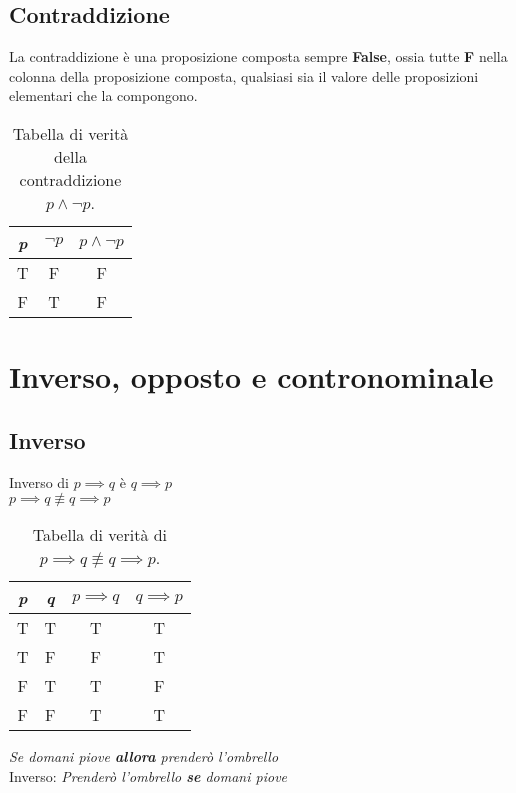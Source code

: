 \subsection{Contraddizione}
La contraddizione è una proposizione composta sempre \textbf{False}, ossia tutte \textbf{F} nella colonna della proposizione composta, qualsiasi sia il valore delle proposizioni elementari che la compongono.
\begin{table}[H]
    \caption{\label{tab:true_table_contraddizione}Tabella di verità della contraddizione $p \wedge \neg p$.}
    \centering
    \begin{tabular}{|c | c || c ||} 
     \hline
     \textit{p} & $\neg p$ & $p \wedge \neg p$ \\
     \hline\hline
     T & F & F \\ 
     \hline
     F & T & F \\
     \hline
    \end{tabular}
\end{table}

\section{Inverso, opposto e contronominale}
\subsection{Inverso}
Inverso di $p \implies q$ è $q \implies p$ \\
$p \implies q \not\equiv q \implies p$
\begin{table}[H]
    \centering    
    \caption{\label{tab:true_table_inverso}Tabella di verità di $p \implies q \not\equiv q \implies p$.}
    \begin{tabular}{|c | c | c || c ||} 
     \hline
     \textit{p} & \textit{q} & $p \implies q$ & $q \implies p$ \\
     \hline\hline
     T & T & T & T\\ 
     \hline
     T & F & F & T\\
     \hline
     F & T & T  & F\\
     \hline
     F & F & T & T \\
     \hline
    \end{tabular}
\end{table}
\begin{example}
\emph{Se domani piove \textbf{allora} prenderò l'ombrello} \\
Inverso: \emph{Prenderò l'ombrello \textbf{se} domani piove}
\end{example}

